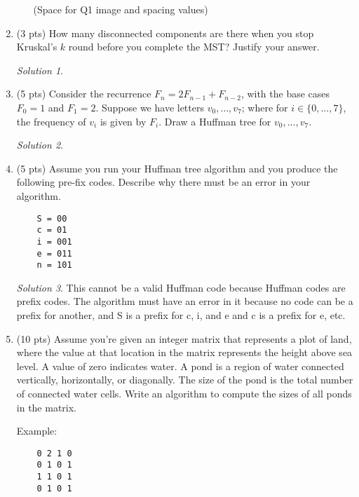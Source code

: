 \documentclass[12pt]{article}
\theoremstyle{remark}
\newtheorem*{solution}{Solution}
\begin{document}
\begin{enumerate}
\begin{enumerate}[label=(\alph*)]
(Space for Q1 image and spacing values)
\pagebreak


\end{enumerate}

\item (3 pts) How many disconnected components are there when you stop Kruskal's $k$ round before you complete the MST? Justify your answer. 
\begin{solution}

\end{solution}


\item (5 pts) Consider the recurrence $F_{n} = 2F_{n-1} + F_{n-2}$, with the base cases $F_{0} = 1$ and $F_{1} = 2$. Suppose we have letters $v_{0}, \ldots, v_{7}$; where for $i \in \{0, \ldots, 7\}$, the frequency of $v_{i}$ is given by $F_{i}$. Draw a Huffman tree for $v_{0}, \ldots, v_{7}$. 

\begin{solution}

\end{solution}
\pagebreak


\item (5 pts) Assume you run your Huffman tree algorithm and you produce the following pre-fix codes. Describe why there must be an error in your algorithm.
\begin{verbatim}
    S = 00
    c = 01
    i = 001
    e = 011
    n = 101
\end{verbatim}
\begin{solution}
This cannot be a valid Huffman code because Huffman codes are prefix codes. The algorithm must have an error in it because no code can be a prefix for another, and S is a prefix for c, i, and e and c is a prefix for e, etc.
\end{solution}
\pagebreak

\item (10 pts) Assume you're given an integer matrix that represents a plot of land, where the value at that location in the matrix represents the height above sea level. A value of zero indicates water. A pond is a region of water connected vertically, horizontally, or diagonally. The size of the pond is the total number of connected water cells. Write an algorithm to compute the sizes of all ponds in the matrix.

Example:
\begin{verbatim}
    0 2 1 0
    0 1 0 1
    1 1 0 1
    0 1 0 1
\end{verbatim}


\end{enumerate}
\end{document}
